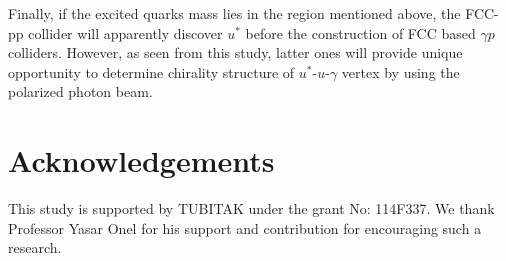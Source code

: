 \documentclass{appolb}
\begin{document}
Finally, if the excited quarks mass lies in the region mentioned above, the FCC-pp collider will apparently discover  $u^*$ before the construction of FCC based $\gamma p$ colliders. However, as seen from this study, latter ones will provide unique opportunity to determine chirality structure of $u^*$-$u$-$\gamma$ vertex by using the polarized photon beam.

\section{Acknowledgements}	
This study is supported by TUBITAK under the grant No: 114F337. We  thank Professor Yasar Onel for his support and contribution for encouraging such a research.



\end{document}
